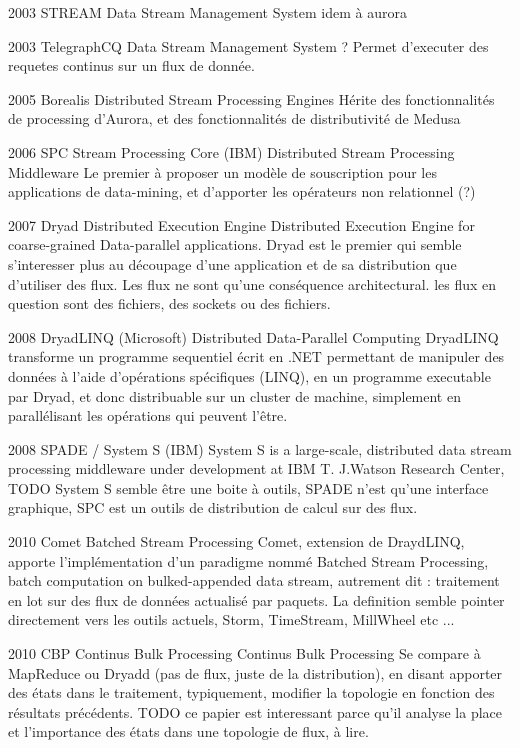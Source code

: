   2003    STREAM                   Data Stream Management System           idem à aurora

  2003    TelegraphCQ                Data Stream Management System ?          Permet d'executer des requetes continus sur un flux de donnée.

  2005    Borealis                Distributed Stream Processing Engines        Hérite des fonctionnalités de processing d'Aurora, et des fonctionnalités de distributivité de Medusa

  2006    SPC Stream Processing Core (IBM)    Distributed Stream Processing Middleware    Le premier à proposer un modèle de souscription pour les applications de data-mining, et d'apporter les opérateurs non relationnel (?)

  2007    Dryad                   Distributed Execution Engine             Distributed Execution Engine for coarse-grained Data-parallel applications. Dryad est le premier qui semble s'interesser plus au découpage d'une application et de sa distribution que d'utiliser des flux. Les flux ne sont qu'une conséquence architectural. les flux en question sont des fichiers, des sockets ou des fichiers.

  2008     DryadLINQ (Microsoft)          Distributed Data-Parallel Computing        DryadLINQ transforme un programme sequentiel écrit en .NET permettant de manipuler des données à l'aide d'opérations spécifiques (LINQ), en un programme executable par Dryad, et donc distribuable sur un cluster de machine, simplement en parallélisant les opérations qui peuvent l'être.

  2008    SPADE / System S (IBM)                                  System S is a large-scale, distributed data stream processing middleware under development at IBM T. J.Watson Research Center, TODO System S semble être une boite à outils, SPADE n'est qu'une interface graphique, SPC est un outils de distribution de calcul sur des flux.

  2010    Comet                   Batched Stream Processing             Comet, extension de DraydLINQ, apporte l'implémentation d'un paradigme nommé Batched Stream Processing, batch computation on bulked-appended data stream, autrement dit : traitement en lot sur des flux de données actualisé par paquets. La definition semble pointer directement vers les outils actuels, Storm, TimeStream, MillWheel etc ...

  2010     CBP Continus Bulk Processing       Continus Bulk Processing             Se compare à MapReduce ou Dryadd (pas de flux, juste de la distribution), en disant apporter des états dans le traitement, typiquement, modifier la topologie en fonction des résultats précédents.
  TODO ce papier est interessant parce qu'il analyse la place et l'importance des états dans une topologie de flux, à lire.

